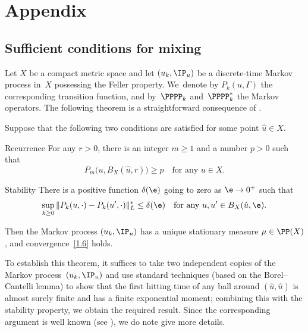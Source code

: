 \section{Appendix}\label{s5}
\subsection{Sufficient conditions for mixing}\label{s5.1}

Let $X$ be a compact metric space and let $(u_k,\IP_u)$ be a discrete-time Markov process
in~$X$ possessing the Feller property. We~denote by $P_k(u,\Gamma)$ the corresponding transition function, and by~$\PPPP_k$ and~$\PPPP_k^*$ the Markov operators. The following theorem is a straightforward consequence of \cite[Th.\,3.1.3]{KS-book}.

\begin{theorem} \label{t5.1}
Suppose that the following two conditions are satisfied for some point $\hat u\in X$.\vspace*{-.5\baselineskip}
\begin{enonce*}{Recurrence}
For any $r>0$, there is an integer $m\ge1$ and a number $p>0$ such that\vspace*{-5pt}
\begin{equation} \label{5.1}
P_m\bigl(u,B_X(\hat u,r)\bigr)\ge p\quad\text{for any $u\in X$}.
\end{equation}
\end{enonce*}
\begin{enonce*}{Stability}
There is a positive function $\delta(\e)$ going to zero as $\e\to0^+$ such that\vspace*{-3pt}
\begin{equation} \label{5.2}
\sup_{k\ge0}\|P_k(u,\cdot)-P_k(u',\cdot)\|_L^*\le\delta(\e)
\quad\text{for any $u,u'\in B_X(\hat u,\e)$}.
\end{equation}
\end{enonce*}
Then the Markov process $(u_k,\IP_u)$ has a unique stationary measure $\mu\in\PP(X)$,
and convergence~\eqref{1.6} holds.
\end{theorem}

To establish this theorem, it suffices to take two independent copies of the Markov process~$(u_k,\IP_u)$ and use standard techniques (based on the Borel--Cantelli lemma) to show that the first hitting time of any ball around $(\hat u,\hat u)$ is almost surely finite and has a finite exponential moment; combining this with the stability property, we obtain the required result. Since the corresponding argument is well known (\eg see \cite[\S3.3]{KS-book}), we do note give more details.

